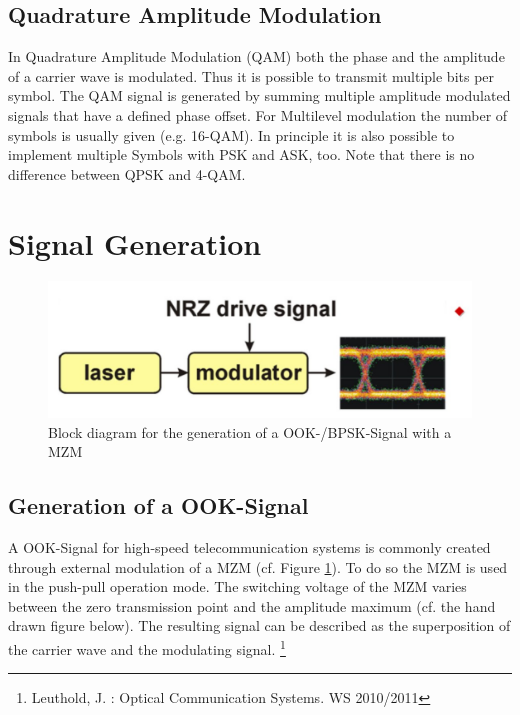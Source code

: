 \subsection{Quadrature Amplitude Modulation}
In Quadrature Amplitude Modulation (QAM) both the phase and the amplitude of a carrier wave is modulated. Thus it is possible to transmit multiple bits per symbol. The QAM signal is generated by summing multiple amplitude modulated signals that have a defined phase offset. For Multilevel modulation the number of symbols is usually given (e.g. 16-QAM). In principle it is also possible to implement multiple Symbols with PSK and ASK, too. Note that there is no difference between QPSK and 4-QAM.\footnotemark[1]
\newpage
\section{Signal Generation}
\begin{figure}
  \centering
  \includegraphics[width=.5\columnwidth]{Grafiken/Signal-generation.jpg}

\caption{Block diagram for the generation of a OOK-/BPSK-Signal with a MZM }
\label{fig:signal}
\end{figure}

\subsection{Generation of a OOK-Signal}
A OOK-Signal for high-speed telecommunication systems is commonly created through external modulation of a MZM (cf. Figure \ref{fig:signal}). To do so the MZM is used in the push-pull operation mode. The switching voltage of the MZM varies between the zero transmission point and the amplitude maximum (cf. the hand drawn figure below). The resulting signal can be described as the superposition of the carrier wave and the modulating signal. \footnote[1]{Leuthold, J. : Optical Communication Systems. WS 2010/2011}
